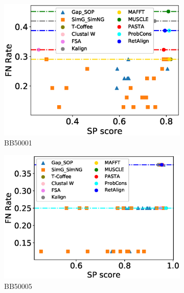 \begin{figure}[!htbp]
\begin{adjustwidth}{-1cm}{-1cm}
\begin{subfigure}{0.22\textwidth}
			\includegraphics[width=\columnwidth]{Figure/summary/precomputedInit/Balibase/BB50001_fnrate_vs_sp_2}
			\caption{BB50001}
		\end{subfigure}	
		\begin{subfigure}{0.22\textwidth}
			\includegraphics[width=\columnwidth]{Figure/summary/precomputedInit/Balibase/BB50005_fnrate_vs_sp_2}
			\caption{BB50005}
		\end{subfigure}
		\begin{subfigure}{0.22\textwidth}

\end{subfigure}
\end{adjustwidth}
\end{figure}
